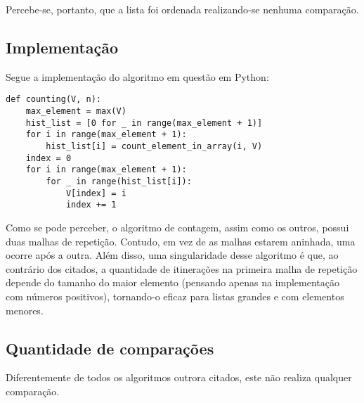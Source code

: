 Percebe-se, portanto, que a lista foi ordenada realizando-se nenhuma comparação.

\subsection{Implementação}
Segue a implementação do algoritmo em questão em Python:

\begin{lstlisting}
def counting(V, n):
    max_element = max(V)
    hist_list = [0 for _ in range(max_element + 1)]
    for i in range(max_element + 1):
        hist_list[i] = count_element_in_array(i, V)
    index = 0
    for i in range(max_element + 1):
        for _ in range(hist_list[i]):
            V[index] = i
            index += 1
\end{lstlisting}

Como se pode perceber, o algoritmo de contagem, assim como os outros, possui duas malhas de repetição. Contudo, em vez de as malhas estarem aninhada, uma ocorre após a outra.
Além disso, uma singularidade desse algoritmo é que, ao contrário dos citados, a quantidade de itinerações na primeira malha de repetição depende do tamanho do maior elemento (pensando apenas na implementação com números positivos), tornando-o eficaz para listas grandes e com elementos menores.

\subsection{Quantidade de comparações}
Diferentemente de todos os algoritmos outrora citados, este não realiza qualquer comparação.